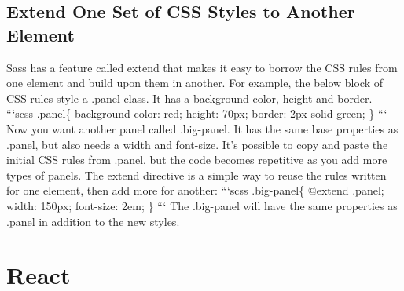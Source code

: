 \documentclass{article}%
\begin{document}
%
\subsection{Extend One Set of CSS Styles to Another Element}%
\label{subsec:ExtendOneSetofCSSStylestoAnotherElement}%
Sass has a feature called extend that makes it easy to borrow the CSS rules from one element and build upon them in another.\newline%
For example, the below block of CSS rules style a .panel class. It has a background{-}color, height and border.\newline%
```scss\newline%
.panel\{\newline%
  background{-}color: red;\newline%
  height: 70px;\newline%
  border: 2px solid green;\newline%
\}\newline%
```\newline%
Now you want another panel called .big{-}panel. It has the same base properties as .panel, but also needs a width and font{-}size.\newline%
It's possible to copy and paste the initial CSS rules from .panel, but the code becomes repetitive as you add more types of panels.\newline%
The extend directive is a simple way to reuse the rules written for one element, then add more for another:\newline%
```scss\newline%
.big{-}panel\{\newline%
  @extend .panel;\newline%
  width: 150px;\newline%
  font{-}size: 2em;\newline%
\}\newline%
```\newline%
The .big{-}panel will have the same properties as .panel in addition to the new styles.\newline%

%
\newpage%
\section{React}%
\label{sec:React}%
\end{document}
